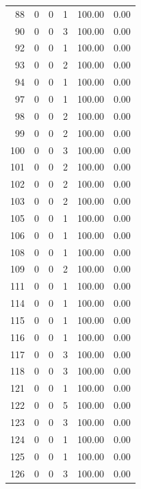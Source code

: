 \documentclass[11pt]{article}
\begin{document}
\begin{longtable}{r|r|r|r|r|r}
    88    & 0     & 0     & 1     & 100.00 & 0.00 \\
    90    & 0     & 0     & 3     & 100.00 & 0.00 \\
    92    & 0     & 0     & 1     & 100.00 & 0.00 \\
    93    & 0     & 0     & 2     & 100.00 & 0.00 \\
    94    & 0     & 0     & 1     & 100.00 & 0.00 \\
    97    & 0     & 0     & 1     & 100.00 & 0.00 \\
    98    & 0     & 0     & 2     & 100.00 & 0.00 \\
    99    & 0     & 0     & 2     & 100.00 & 0.00 \\
    100   & 0     & 0     & 3     & 100.00 & 0.00 \\
    101   & 0     & 0     & 2     & 100.00 & 0.00 \\
    102   & 0     & 0     & 2     & 100.00 & 0.00 \\
    103   & 0     & 0     & 2     & 100.00 & 0.00 \\
    105   & 0     & 0     & 1     & 100.00 & 0.00 \\
    106   & 0     & 0     & 1     & 100.00 & 0.00 \\
    108   & 0     & 0     & 1     & 100.00 & 0.00 \\
    109   & 0     & 0     & 2     & 100.00 & 0.00 \\
    111   & 0     & 0     & 1     & 100.00 & 0.00 \\
    114   & 0     & 0     & 1     & 100.00 & 0.00 \\
    115   & 0     & 0     & 1     & 100.00 & 0.00 \\
    116   & 0     & 0     & 1     & 100.00 & 0.00 \\
    117   & 0     & 0     & 3     & 100.00 & 0.00 \\
    118   & 0     & 0     & 3     & 100.00 & 0.00 \\
    121   & 0     & 0     & 1     & 100.00 & 0.00 \\
    122   & 0     & 0     & 5     & 100.00 & 0.00 \\
    123   & 0     & 0     & 3     & 100.00 & 0.00 \\
    124   & 0     & 0     & 1     & 100.00 & 0.00 \\
    125   & 0     & 0     & 1     & 100.00 & 0.00 \\
    126   & 0     & 0     & 3     & 100.00 & 0.00 \\

\end{longtable}
\end{document}
